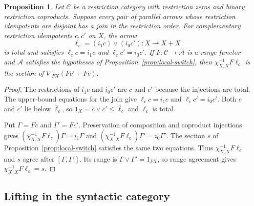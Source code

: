 \documentclass[11pt]{article}
\newtheorem{proposition}[theorem]{Proposition}
\begin{document}
\begin{proposition}\label{prop:disjoint-joins}
Let $\mathcal C$ be a restriction category with restriction zeros and
binary restriction coproducts. Suppose every pair of parallel arrows
whose restriction idempotents are disjoint has a join in the restriction
order.
For complementary restriction idempotents $c,c'$ on $X$, the arrow
\[
 \ell_c=(i_1c)\vee(i_0c'):X\rightharpoonup X+X
\]
is total and satisfies $\ell_cc=i_1c$ and $\ell_cc'=i_0c'$.
If $F:\mathcal C\to\mathcal A$ is a range functor and $\mathcal A$
satisfies the hypotheses of Proposition~\ref{prop:local-switch},
then $\chi_{X,X}^{-1}F\ell_c$ is the section of
$\nabla_{FX}(Fc'+Fc)$.
\end{proposition}
\begin{proof}
The restrictions of $i_1c$ and $i_0c'$ are $c$ and $c'$ because
the injections are total. The upper-bound equations for the join
give $\ell_cc=i_1c$ and $\ell_cc'=i_0c'$.
Both $c$ and $c'$ lie below $\bar\ell_c$, so
$1_X=c\vee c'\le\bar\ell_c$ and $\ell_c$ is total.

Put $\Gamma=Fc$ and $\Gamma'=Fc'$. Preservation of composition
and coproduct injections gives
$(\chi_{X,X}^{-1}F\ell_c)\Gamma=i_1\Gamma$ and
$(\chi_{X,X}^{-1}F\ell_c)\Gamma'=i_0\Gamma'$.
The section $s$ of Proposition~\ref{prop:local-switch} satisfies the
same two equations. Thus $\chi_{X,X}^{-1}F\ell_c$ and $s$ agree after
$[\Gamma,\Gamma']$. Its range is
$\Gamma\vee\Gamma'=1_{FX}$, so range agreement gives
$\chi_{X,X}^{-1}F\ell_c=s$.
\end{proof}

\subsection{Lifting in the syntactic category}
\end{document}
